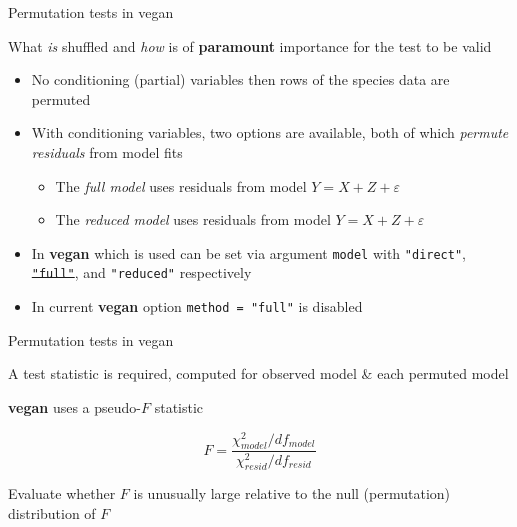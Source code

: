 \documentclass[10pt,ignorenonframetext,compress, aspectratio=169]{beamer}
\begin{document}
\begin{frame}{Permutation tests in vegan}

What \emph{is} shuffled and \emph{how} is of \textbf{paramount}
importance for the test to be valid

\begin{itemize}
\itemsep1pt\parskip0pt
\item
  No conditioning (partial) variables then rows of the species data are
  permuted
\item
  With conditioning variables, two options are available, both of which
  \emph{permute residuals} from model fits

  \begin{itemize}
  \itemsep1pt\parskip0pt
  \item
    The \emph{full model} uses residuals from model
    \(Y = X + Z + \varepsilon\)
  \item
    The \emph{reduced model} uses residuals from model
    \(Y = X + Z + \varepsilon\)
  \end{itemize}
\item
  In \textbf{vegan} which is used can be set via argument \texttt{model}
  with \texttt{"direct"}, \sout{\texttt{"full"}}, and \texttt{"reduced"}
  respectively
\item
  In current \textbf{vegan} option \texttt{method\ =\ "full"} is
  disabled
\end{itemize}

\end{frame}

\begin{frame}{Permutation tests in vegan}

A test statistic is required, computed for observed model \& each
permuted model

\textbf{vegan} uses a pseudo-\(F\) statistic

\[F=\frac{\chi^2_{model} / df_{model}}{\chi^2_{resid} / df_{resid}}\]

Evaluate whether \(F\) is unusually large relative to the null
(permutation) distribution of \(F\)

\end{frame}
\end{document}
